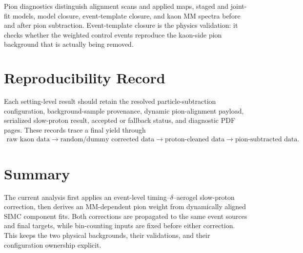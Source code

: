 \documentclass[11pt]{article}
\begin{document}
Pion diagnostics distinguish alignment scans and applied maps, staged and
joint-fit models, model closure, event-template closure, and kaon MM spectra
before and after pion subtraction.  Event-template closure is the physics
validation: it checks whether the weighted control events reproduce the
kaon-side pion background that is actually being removed.

\section{Reproducibility Record}

Each setting-level result should retain the resolved particle-subtraction
configuration, background-sample provenance, dynamic pion-alignment payload,
serialized slow-proton result, accepted or fallback status, and diagnostic
PDF pages.  These records trace a final yield through
\begin{align}
  \text{raw kaon data}
  \to\text{random/dummy corrected data}
  \to\text{proton-cleaned data}
  \to\text{pion-subtracted data}.
\end{align}

\section{Summary}

The current analysis first applies an event-level timing--$\delta$--aerogel
slow-proton correction, then derives an MM-dependent pion weight from
dynamically aligned SIMC component fits.  Both corrections are propagated to
the same event sources and final targets, while bin-counting inputs are fixed
before either correction.  This keeps the two physical backgrounds, their
validations, and their configuration ownership explicit.
\end{document}

